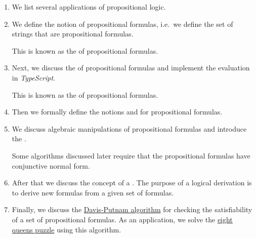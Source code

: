 \begin{enumerate}
\item We list several applications of propositional logic.
\item We define the notion of propositional formulas, i.e.~we define the set of strings that are
      propositional formulas.

      This is known as the  of propositional formulas.
\item Next, we discuss the  of propositional formulas and implement the evaluation in \textsl{TypeScript}.

      This is known as the  of propositional formulas.
\item Then we formally define the notions  and  for propositional formulas.   
\item We discuss algebraic manipulations of propositional formulas and introduce the 
      .

      Some algorithms discussed later require that the propositional formulas have conjunctive normal form.
\item After that we discuss the concept of a .  The purpose of a logical derivation is to
      derive new formulas from a given set of formulas.
\item Finally, we discuss the \href{https://en.wikipedia.org/wiki/Davis–Putnam_algorithm}{Davis-Putnam
      algorithm} for checking the satisfiability of a set of  propositional formulas.  As an application, we
      solve the \href{https://en.wikipedia.org/wiki/Eight_queens_puzzle}{eight queens puzzle} using this algorithm.
\end{enumerate}

